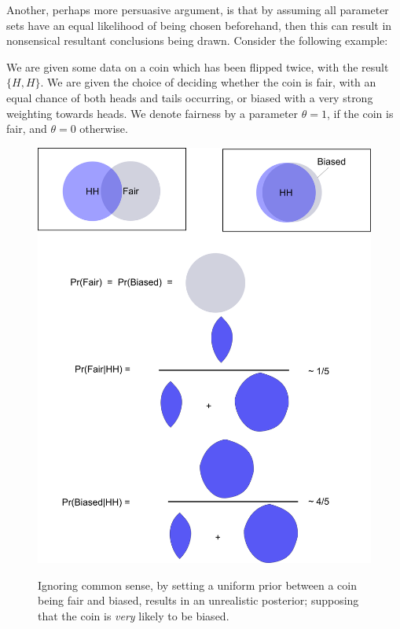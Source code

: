 \documentclass[11pt,fullpage]{book}
\begin{document}
Another, perhaps more persuasive argument, is that by assuming all parameter sets have an equal likelihood of being chosen beforehand, then this can result in nonsensical resultant conclusions being drawn. Consider the following example: 

We are given some data on a coin which has been flipped twice, with the result $\{H,H\}$. We are given the choice of deciding whether the  coin is fair, with an equal chance of both heads and tails occurring, or biased with a very strong weighting towards heads. We denote fairness by a parameter $\theta=1$, if the coin is fair, and $\theta=0$ otherwise.

\begin{figure}
\centering
\scalebox{0.1} 
{\includegraphics{Prior_priorJustificationCoin.png}}
\caption{Ignoring common sense, by setting a uniform prior between a coin being fair and biased, results in an unrealistic posterior; supposing that the coin is \textit{very} likely to be biased.}\label{fig:Prior_priorJustificationCoin}
\end{figure}
\end{document}
